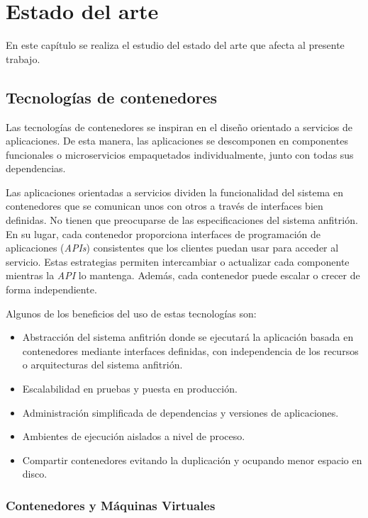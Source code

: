 \chapter{Estado del arte}
\label{cha:state_of_art}

En este capítulo se realiza el estudio del estado del arte que afecta al presente trabajo.

\section{Tecnologías de contenedores}

Las tecnologías de contenedores se inspiran en el diseño orientado a servicios de aplicaciones. De esta manera, las aplicaciones se descomponen en componentes funcionales o microservicios empaquetados individualmente, junto con todas sus dependencias.

Las aplicaciones orientadas a servicios dividen la funcionalidad del sistema en contenedores que se comunican unos con otros a través de interfaces bien definidas. No tienen que preocuparse de las especificaciones del sistema anfitrión. En su lugar, cada contenedor proporciona interfaces de programación de aplicaciones (\textit{APIs}) consistentes que los clientes puedan usar para acceder al servicio. Estas estrategias permiten intercambiar o actualizar cada componente mientras la \textit{API} lo mantenga. Además, cada contenedor puede escalar o crecer de forma independiente.

Algunos de los beneficios del uso de estas tecnologías son:
\begin{itemize}
\item Abstracción del sistema anfitrión donde se ejecutará la aplicación basada en contenedores mediante interfaces definidas, con independencia de los recursos o arquitecturas del sistema anfitrión.
\item Escalabilidad en pruebas y puesta en producción.
\item Administración simplificada de dependencias y versiones de aplicaciones.
\item Ambientes de ejecución aislados a nivel de proceso.
\item Compartir contenedores evitando la duplicación y ocupando menor espacio en disco.
\end{itemize}

\subsection{Contenedores y Máquinas Virtuales}

